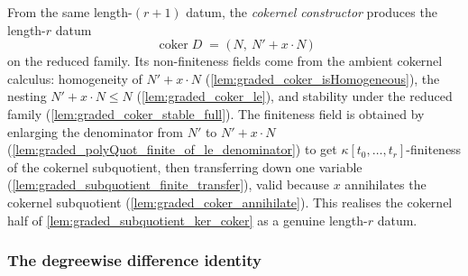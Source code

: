 \begin{definition}

  \label{def:graded_subquotientDatum_coker}
  From the same length-\((r+1)\) datum, the \emph{cokernel constructor} produces the
  length-\(r\) datum
  \[
    \operatorname{coker} D \;=\; \bigl(\,N,\ N' + x \cdot N\,\bigr)
  \]
  on the reduced family. Its non-finiteness fields come from the ambient cokernel
  calculus: homogeneity of \(N' + x \cdot N\) (\cref{lem:graded_coker_isHomogeneous}),
  the nesting \(N' + x \cdot N \le N\) (\cref{lem:graded_coker_le}), and stability
  under the reduced family (\cref{lem:graded_coker_stable_full}). The finiteness field
  is obtained by enlarging the denominator from \(N'\) to \(N' + x \cdot N\)
  (\cref{lem:graded_polyQuot_finite_of_le_denominator}) to get
  \(\kappa[t_0, \dots, t_r]\)-finiteness of the cokernel subquotient, then
  transferring down one variable (\cref{lem:graded_subquotient_finite_transfer}),
  valid because \(x\) annihilates the cokernel subquotient
  (\cref{lem:graded_coker_annihilate}). This realises the cokernel half of
  \cref{lem:graded_subquotient_ker_coker} as a genuine length-\(r\) datum.
\end{definition}

\subsubsection*{The degreewise difference identity}

